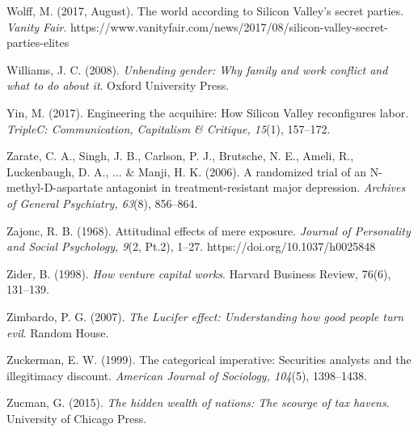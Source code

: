 \begin{thebibliography}{}
    Wolff, M. (2017, August). The world according to Silicon Valley’s secret parties. \textit{Vanity Fair}. https://www.vanityfair.com/news/2017/08/silicon-valley-secret-parties-elites
    
    Williams, J. C. (2008). \textit{Unbending gender: Why family and work conflict and what to do about it}. Oxford University Press.



    Yin, M. (2017). Engineering the acquihire: How Silicon Valley reconfigures labor. \textit{TripleC: Communication, Capitalism \& Critique, 15}(1), 157–172.


    Zarate, C. A., Singh, J. B., Carlson, P. J., Brutsche, N. E., Ameli, R., Luckenbaugh, D. A., ... \& Manji, H. K. (2006). A randomized trial of an N-methyl-D-aspartate antagonist in treatment-resistant major depression. \textit{Archives of General Psychiatry, 63}(8), 856–864.

    Zajonc, R. B. (1968). Attitudinal effects of mere exposure. \textit{Journal of Personality and Social Psychology, 9}(2, Pt.2), 1--27. https://doi.org/10.1037/h0025848

    Zider, B. (1998). \textit{How venture capital works}. Harvard Business Review, 76(6), 131–139.

    Zimbardo, P. G. (2007). \textit{The Lucifer effect: Understanding how good people turn evil}. Random House.

    Zuckerman, E. W. (1999). The categorical imperative: Securities analysts and the illegitimacy discount. \textit{American Journal of Sociology, 104}(5), 1398–1438.

    Zucman, G. (2015). \textit{The hidden wealth of nations: The scourge of tax havens}. University of Chicago Press.

    
    
    
    

    
    
    
    
        
    
    
    
    


\end{thebibliography}
